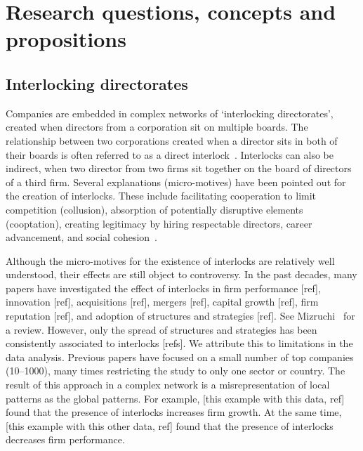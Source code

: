 

\section{Research questions, concepts and propositions}
\label{sec:question}
\subsection{Interlocking directorates}
Companies are embedded in complex networks of `interlocking directorates', 
created when directors from a corporation sit on multiple boards.
The relationship between two corporations created when a director sits in both of their boards is often referred to as a direct interlock~\citep{Mizruchi1996}.
Interlocks can also be indirect,
when two director from two firms sit together on the board of directors of a third firm. 
Several explanations (micro-motives) have been pointed out for the creation of interlocks. 
These include facilitating cooperation to limit competition (collusion),  
absorption of potentially disruptive elements (cooptation), 
creating legitimacy by hiring respectable directors, 
career advancement, and social cohesion~\citep{Mizruchi1996}.

Although the micro-motives for the existence of interlocks are relatively well understood, 
their effects are still object to controversy. 
In the past decades, many papers have investigated the effect of interlocks in firm performance [ref], innovation [ref], acquisitions [ref], mergers [ref], capital growth [ref], firm reputation [ref], and adoption of structures and strategies [ref]. See Mizruchi~\cite{Mizruchi1996} for a review.
However, only the spread of structures and strategies has been consistently associated to interlocks [refs].
We attribute this to limitations in the data analysis.
Previous papers have focused on a small number of top companies (10--1000), 
many times restricting the study to only one sector or country. 
The result of this approach in a complex network is a misrepresentation of local patterns as the global patterns.
For example, 
[this example with this data, ref] found that the presence of interlocks increases firm growth.
At the same time,
[this example with this other data, ref] found that the presence of interlocks decreases firm performance.




